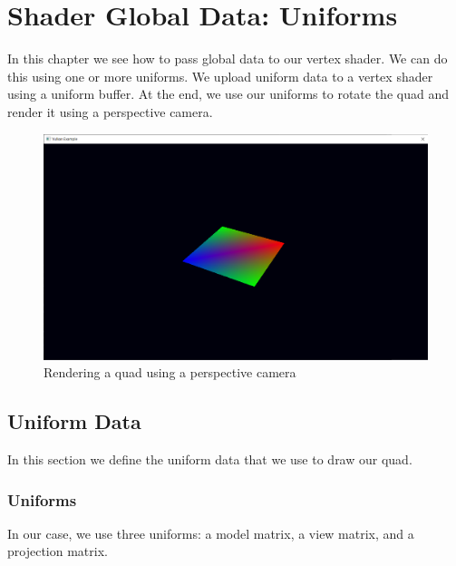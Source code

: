\chapter{Shader Global Data: Uniforms}
\label{chap:Uniforms}

In this chapter we see how to pass global data to our vertex shader.
We can do this using one or more uniforms.
We upload uniform data to a vertex shader using a uniform buffer.
At the end, we use our uniforms to rotate the quad and render it
using a perspective camera.

\begin{figure}[ht]
    \centering
    \includegraphics[scale=0.20]{images/ChUniforms/RenderQuad.png}
    \caption{Rendering a quad using a perspective camera}
    \label{fig::RenderQuadUniforms}
\end{figure}

\section{Uniform Data}

In this section we define the uniform data that we use to draw our quad.

\subsection{Uniforms}

In our case, we use three uniforms:
a model matrix,
a view matrix,
and a projection matrix.

\begin{minipage}{\linewidth}{\noindent}
    
\end{minipage}


